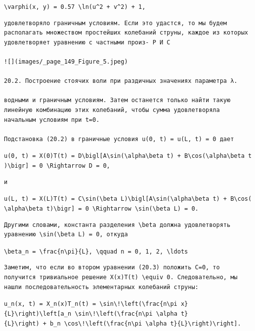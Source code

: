 \documentclass[
  ukrainian,
]{article}
\begin{document}
\texttt{\textbackslash{}varphi(x,\ y)\ =\ 0.57\ \textbackslash{}ln(u\^{}2\ +\ v\^{}2)\ +\ 1,}

\begin{verbatim}
удовлетворяло граничным условиям. Если это удастся, то мы будем располагать множеством простейших колебаний струны, каждое из которых удовлетворяет уравнению с частными произ- Р И С

![](images/_page_149_Figure_5.jpeg)

20.2. Построение стоячих воли при раздичных значениях параметра λ.

водными и граничным условиям. Затем останется только найти такую линейную комбинацию этих колебаний, чтобы сумма удовлетворяла начальным условиям при t=0.

Подстановка (20.2) в граничные условия u(0, t) = u(L, t) = 0 дает
\end{verbatim}

\texttt{u(0,\ t)\ =\ X(0)T(t)\ =\ D\textbackslash{}bigl{[}A\textbackslash{}sin(\textbackslash{}alpha\textbackslash{}beta\ t)\ +\ B\textbackslash{}cos(\textbackslash{}alpha\textbackslash{}beta\ t)\textbackslash{}bigr{]}\ =\ 0\ \textbackslash{}Rightarrow\ D\ =\ 0,}

\begin{verbatim}
и
\end{verbatim}

\texttt{u(L,\ t)\ =\ X(L)T(t)\ =\ C\textbackslash{}sin(\textbackslash{}beta\ L)\textbackslash{}bigl{[}A\textbackslash{}sin(\textbackslash{}alpha\textbackslash{}beta\ t)\ +\ B\textbackslash{}cos(\textbackslash{}alpha\textbackslash{}beta\ t)\textbackslash{}bigr{]}\ =\ 0\ \textbackslash{}Rightarrow\ \textbackslash{}sin(\textbackslash{}beta\ L)\ =\ 0.}

\begin{verbatim}
Другими словами, константа разделения \beta должна удовлетворять уравнению \sin(\beta L) = 0, откуда
\end{verbatim}

\texttt{\textbackslash{}beta\_n\ =\ \textbackslash{}frac\{n\textbackslash{}pi\}\{L\},\ \textbackslash{}qquad\ n\ =\ 0,\ 1,\ 2,\ \textbackslash{}ldots}

\begin{verbatim}
Заметим, что если во втором уравнении (20.3) положить C=0, то получится тривиальное решение X(x)T(t) \equiv 0. Следовательно, мы нашли последовательность элементарных колебаний струны:
\end{verbatim}

\texttt{u\_n(x,\ t)\ =\ X\_n(x)T\_n(t)\ =\ \textbackslash{}sin\textbackslash{}!\textbackslash{}left(\textbackslash{}frac\{n\textbackslash{}pi\ x\}\{L\}\textbackslash{}right)\textbackslash{}left{[}a\_n\ \textbackslash{}sin\textbackslash{}!\textbackslash{}left(\textbackslash{}frac\{n\textbackslash{}pi\ \textbackslash{}alpha\ t\}\{L\}\textbackslash{}right)\ +\ b\_n\ \textbackslash{}cos\textbackslash{}!\textbackslash{}left(\textbackslash{}frac\{n\textbackslash{}pi\ \textbackslash{}alpha\ t\}\{L\}\textbackslash{}right)\textbackslash{}right{]}.}
\end{document}
